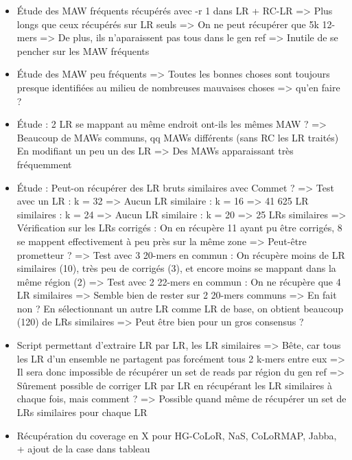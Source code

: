 \documentclass[12pt]{report}
\begin{document}
\begin{itemize}
	\item Étude des MAW fréquents récupérés avec -r 1 dans LR + RC-LR
		  => Plus longs que ceux récupérés sur LR seuls
		  => On ne peut récupérer que 5k 12-mers
		  => De plus, ils n'aparaissent pas tous dans le gen ref
		  => Inutile de se pencher sur les MAW fréquents
		  
	\item Étude des MAW peu fréquents
		  => Toutes les bonnes choses sont toujours presque identifiées au milieu de nombreuses mauvaises choses
		  => qu'en faire ?
		  
	\item Étude : 2 LR se mappant au même endroit ont-ils les mêmes MAW ?
		  => Beaucoup de MAWs communs, qq MAWs différents (sans RC les LR traités)
		  En modifiant un peu un des LR => Des MAWs apparaissant très fréquemment
		  
	\item Étude : Peut-on récupérer des LR bruts similaires avec Commet ?
		  => Test avec un LR : k = 32 => Aucun LR similaire
		                     : k = 16 => 41 625 LR similaires
		                     : k = 24 => Aucun LR similaire
		                     : k = 20 => 25 LRs similaires
		  => Vérification sur les LRs corrigés : On en récupère 11 ayant pu être corrigés, 8 se mappent effectivement à peu près sur la même zone
		  => Peut-être prometteur ?
		  => Test avec 3 20-mers en commun : On récupère moins de LR similaires (10), très peu de corrigés (3), et encore moins se mappant
		  	 dans la même région (2)
		  => Test avec 2 22-mers en commun : On ne récupère que 4 LR similaires
		  => Semble bien de rester sur 2 20-mers communs 
		  => En fait non ? En sélectionnant un autre LR comme LR de base, on obtient beaucoup (120) de LRs similaires
		  	 => Peut être bien pour un gros consensus ?
		  
	\item Script permettant d'extraire LR par LR, les LR similaires
		  => Bête, car tous les LR d'un ensemble ne partagent pas forcément tous 2 k-mers entre eux
		  => Il sera donc impossible de récupérer un set de reads par région du gen ref
		  => Sûrement possible de corriger LR par LR en récupérant les LR similaires à chaque fois, mais comment ?
		  => Possible quand même de récupérer un set de LRs similaires pour chaque LR
		  
	\item Récupération du coverage en X pour HG-CoLoR, NaS, CoLoRMAP, Jabba, + ajout de la case dans tableau
	

\end{itemize}
\end{document}
